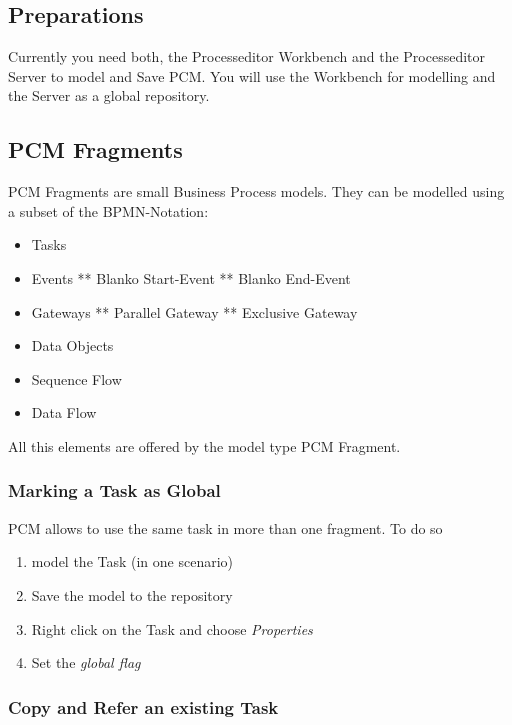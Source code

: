 \documentclass{acm_proc_article-sp}
\begin{document}
%
%
\subsection{Preparations}\label{preparations}
Currently you need both, the Processeditor Workbench and the
Processeditor Server to model and Save PCM. You will use the Workbench
for modelling and the Server as a global repository.

%
%
\subsection{PCM Fragments}\label{pcm-fragments}

PCM Fragments are small Business Process models. They can be modelled
using a subset of the BPMN-Notation:

\begin{itemize}
\itemsep1pt\parskip0pt
\item
  Tasks
\item
  Events ** Blanko Start-Event ** Blanko End-Event
\item
  Gateways ** Parallel Gateway ** Exclusive Gateway
\item
  Data Objects
\item
  Sequence Flow
\item
  Data Flow
\end{itemize}

All this elements are offered by the model type PCM Fragment.

%
%
\subsubsection{Marking a Task as Global}\label{marking-a-task-as-global}
PCM allows to use the same task in more than one fragment. To do so

\begin{enumerate}
\def\labelenumi{\arabic{enumi}.}
\itemsep1pt\parskip0pt
\item
  model the Task (in one scenario)
\item
  Save the model to the repository
\item
  Right click on the Task and choose \emph{Properties}
\item
  Set the \emph{global flag}
\end{enumerate}

%
%
\subsubsection{Copy and Refer an existing
Task}\label{copy-and-refer-an-existing-task}
\end{document}
